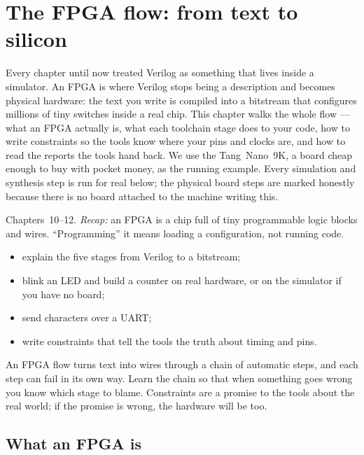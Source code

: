 \chapter{The FPGA flow: from text to silicon}
\label{ch:fpga-flow}

Every chapter until now treated Verilog as something that lives inside a
simulator. An FPGA is where Verilog stops being a description and becomes
physical hardware: the text you write is compiled into a bitstream that
configures millions of tiny switches inside a real chip. This chapter walks the
whole flow --- what an FPGA actually is, what each toolchain stage does to your
code, how to write constraints so the tools know where your pins and clocks
are, and how to read the reports the tools hand back. We use the
Tang~Nano~9K, a board cheap enough to buy with pocket money, as the running
example. Every simulation and synthesis step is run for real below; the
physical board steps are marked honestly because there is no board attached to
the machine writing this.

\begin{rulebox}
Chapters~10--12. \emph{Recap:} an FPGA is a chip full of tiny programmable logic blocks and wires. ``Programming'' it means loading a configuration, not running code.
\end{rulebox}
\begin{wins}
\begin{itemize}
\item explain the five stages from Verilog to a bitstream;
\item blink an LED and build a counter on real hardware, or on the simulator if you have no board;
\item send characters over a UART;
\item write constraints that tell the tools the truth about timing and pins.
\end{itemize}
\end{wins}
\begin{principle}
An FPGA flow turns text into wires through a chain of automatic steps, and each step can fail in its own way. Learn the chain so that when something goes wrong you know which stage to blame. Constraints are a promise to the tools about the real world; if the promise is wrong, the hardware will be too.
\end{principle}

\section{What an FPGA is}

